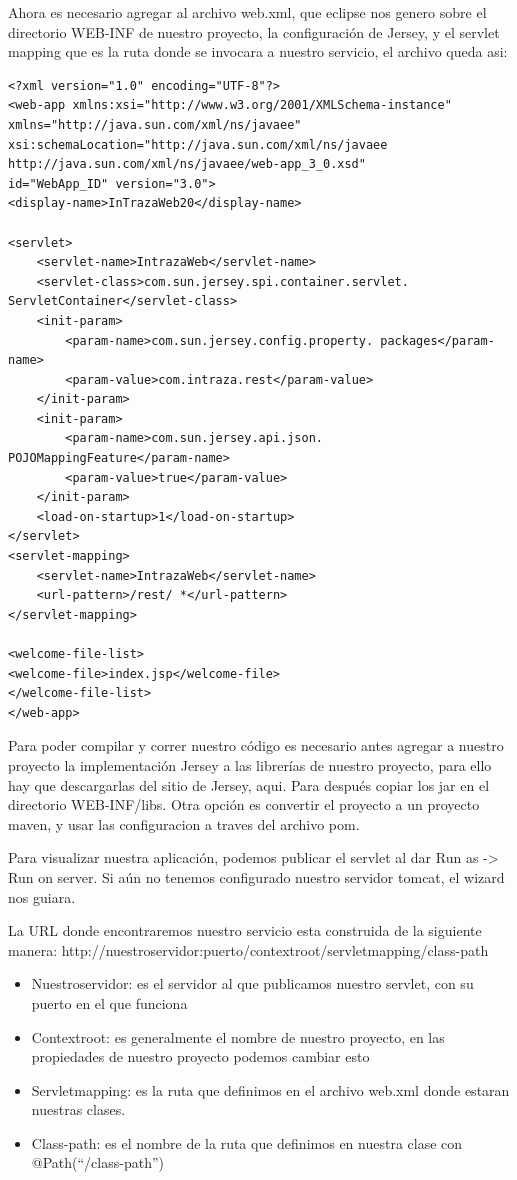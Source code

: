 Ahora es necesario agregar al archivo web.xml, que eclipse nos genero sobre el directorio WEB-INF de nuestro proyecto, la configuración de Jersey, y el servlet mapping que es la ruta donde se invocara a nuestro servicio, el archivo queda asi:
\begin{lstlisting}[style=JAVA]
<?xml version="1.0" encoding="UTF-8"?>
<web-app xmlns:xsi="http://www.w3.org/2001/XMLSchema-instance"
xmlns="http://java.sun.com/xml/ns/javaee"
xsi:schemaLocation="http://java.sun.com/xml/ns/javaee http://java.sun.com/xml/ns/javaee/web-app_3_0.xsd"
id="WebApp_ID" version="3.0">
<display-name>InTrazaWeb20</display-name>

<servlet>
	<servlet-name>IntrazaWeb</servlet-name>
	<servlet-class>com.sun.jersey.spi.container.servlet. ServletContainer</servlet-class>
	<init-param>
		<param-name>com.sun.jersey.config.property. packages</param-name>
		<param-value>com.intraza.rest</param-value>
	</init-param>
	<init-param>
		<param-name>com.sun.jersey.api.json. POJOMappingFeature</param-name>
		<param-value>true</param-value>
	</init-param>
	<load-on-startup>1</load-on-startup>
</servlet>
<servlet-mapping>
	<servlet-name>IntrazaWeb</servlet-name>
	<url-pattern>/rest/ *</url-pattern>
</servlet-mapping>

<welcome-file-list>
<welcome-file>index.jsp</welcome-file>
</welcome-file-list>
</web-app>
\end{lstlisting}

Para poder compilar y correr nuestro código es necesario antes agregar a nuestro proyecto la implementación Jersey a las librerías de nuestro proyecto, para ello hay que descargarlas del sitio de Jersey, aqui. Para después copiar los jar en el directorio WEB-INF/libs. Otra opción es convertir el proyecto a un proyecto maven, y usar las configuracion a traves del archivo pom.

Para visualizar nuestra aplicación, podemos publicar el servlet al dar Run as -> Run on server. Si aún no tenemos configurado nuestro servidor tomcat, el wizard nos guiara.

La URL donde encontraremos nuestro servicio esta construida de la siguiente manera: http://nuestroservidor:puerto/contextroot/servletmapping/class-path

\begin{itemize}
	\item Nuestroservidor: es el servidor al que publicamos nuestro servlet, con su puerto en el que funciona
	\item Contextroot: es generalmente el nombre de nuestro proyecto, en las propiedades de nuestro proyecto podemos cambiar esto
	\item Servletmapping: es la ruta que definimos en el archivo web.xml donde estaran nuestras clases.
	\item Class-path: es el nombre de la ruta que definimos en nuestra clase con @Path(“/class-path”)
\end{itemize}

